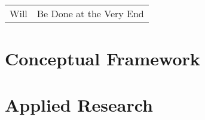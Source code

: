 \documentclass[english,bachelor,unicode,oneside]{ctufit-thesis}
\begin{document}
\printabstractpage


\tableofcontents
\listoffigures %
\begingroup
\let\clearpage\relax
\listoftables %
\thectufitlistingscommand
\endgroup

\chapter{\thectufitabbreviationlabel}

\begin{tabular}{rl}
Will & Be Done at the Very End\\
\end{tabular}

\resumeTOCentries
\mainmatter\mainmatterinit



\part{Conceptual Framework}  %





\part{Applied Research}  %



\appendix\appendixinit


\backmatter

\printbibliography[category=our_papers,heading=none]
\printbibliography[notcategory=our_papers,heading=none]

\end{document}
